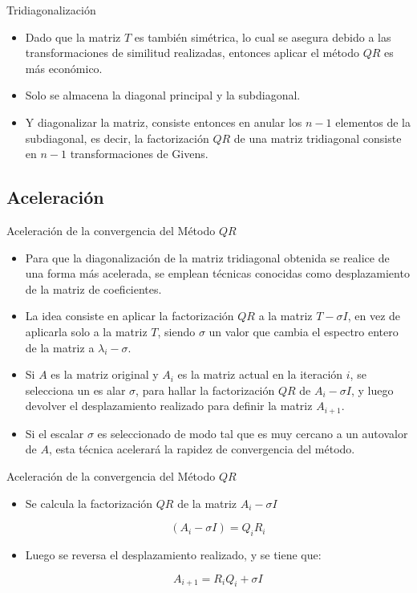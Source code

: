 \documentclass[11pt]{beamer}
\begin{document}
\begin{frame}{Tridiagonalizaci\'on}
\begin{itemize}
   \item Dado que la matriz $T$ es tambi\'en sim\'etrica, lo cual se asegura debido a las 
transformaciones de similitud realizadas, entonces aplicar el m\'etodo $QR$ es m\'as econ\'omico.
\item<2-> Solo se almacena la diagonal principal y la subdiagonal. 
\item<3-> Y diagonalizar la matriz, consiste entonces en anular los $n - 1$ elementos de la 
subdiagonal, es decir, la factorizaci\'on $QR$ de una matriz tridiagonal consiste en $n - 1$ 
transformaciones de Givens.
\end{itemize}
\end{frame}
\subsection{Aceleraci\'on}
\begin{frame}{Aceleraci\'on de la convergencia del M\'etodo $QR$}
\begin{itemize}
   \item Para que la diagonalizaci\'on de la matriz tridiagonal obtenida se realice de una forma
m\'as acelerada, se emplean t\'ecnicas conocidas como desplazamiento de la matriz de coeficientes. 
\item<2-> La idea consiste en aplicar la factorizaci\'on $QR$ a la matriz $T - \sigma I$, en vez de 
aplicarla solo a la matriz $T$, siendo $\sigma$ un valor que cambia el espectro entero de la 
matriz a $\lambda_i - \sigma$.
\item<3-> Si $A$ es la matriz original y $A_i$ es la matriz actual en la iteraci\'on $i$, se 
selecciona un es
alar $\sigma$, para hallar la factorizaci\'on $QR$ de $A_i - \sigma I$, y luego 
devolver el desplazamiento realizado para definir la matriz $A_{i+1}$.
\item<4-> Si el escalar $\sigma$ es seleccionado de modo tal que es muy cercano a un autovalor de
 $A$, esta t\'ecnica acelerar\'a la rapidez de convergencia del m\'etodo.
\end{itemize}
\end{frame}
\begin{frame}{Aceleraci\'on de la convergencia del M\'etodo $QR$}
\begin{itemize}
   \item Se calcula la factorizaci\'on $QR$ de la matriz $A_i - \sigma I$
   \begin{block}{}
   $$
      (A_i - \sigma I) = Q_iR_i
      $$
   \end{block}
\item<2-> Luego se reversa el desplazamiento realizado, y se tiene que:
\begin{block}{}
$$
   A_{i+1} = R_iQ_i + \sigma I
   $$
\end{block}
\end{itemize}
\end{frame}
\end{document}

